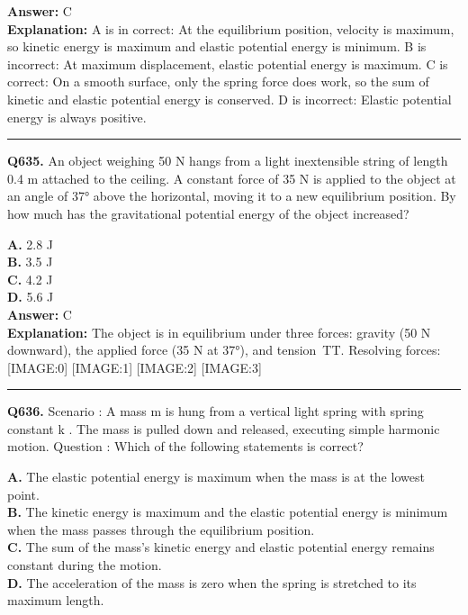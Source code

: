\documentclass[12pt]{article}
\begin{document}
\textbf{Answer:} C \\
\textbf{Explanation:} \cdot 
A is
in
correct: At the equilibrium position, velocity is maximum, so kinetic energy is maximum and elastic potential energy is minimum.
\cdot 
B is incorrect: At maximum displacement, elastic potential energy is maximum.
\cdot 
C is correct: On a smooth surface, only the spring force does work, so the sum of kinetic and elastic potential energy is conserved.
\cdot 
D is incorrect: Elastic potential energy is always positive.

\hrule
\vspace{1em}


\noindent
\textbf{Q635.} An object weighing 50 N hangs from a light inextensible string of length 0.4 m attached to the ceiling. A constant force of 35 N is applied to the object at an angle of 37° above the horizontal, moving it to a new equilibrium position. By how much has the gravitational potential energy of the object increased?



\textbf{A.} 2.8 J \\
\textbf{B.} 3.5 J \\
\textbf{C.} 4.2 J \\
\textbf{D.} 5.6 J \\

\textbf{Answer:} C \\
\textbf{Explanation:} The object is in equilibrium under three forces: gravity (50 N downward), the applied force (35 N at 37°), and tension TT. Resolving forces:
[IMAGE:0]
[IMAGE:1]
[IMAGE:2]
[IMAGE:3]

\hrule
\vspace{1em}


\noindent
\textbf{Q636.} Scenario
: A mass
m
is hung from a vertical light spring with spring constant
k
. The mass is pulled down and released, executing simple harmonic motion.
Question
: Which of the following statements is correct?



\textbf{A.} The elastic potential energy is maximum when the mass is at the lowest point. \\
\textbf{B.} The kinetic energy is maximum and the elastic potential energy is minimum when the mass passes through the equilibrium position. \\
\textbf{C.} The sum of the mass's kinetic energy and elastic potential energy remains constant during the motion. \\
\textbf{D.} The acceleration of the mass is zero when the spring is stretched to its maximum length. \\
\end{document}
